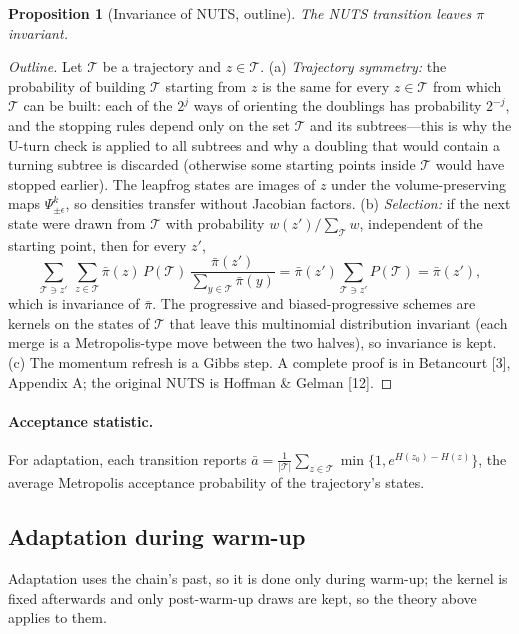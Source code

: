 \documentclass[11pt]{article}
\newtheorem{proposition}[theorem]{Proposition}
\theoremstyle{definition}
\theoremstyle{remark}
\begin{document}
\begin{proposition}[Invariance of NUTS, outline]\label{prop:nuts}
The NUTS transition leaves $\pi$ invariant.
\end{proposition}
\begin{proof}[Outline]
Let $\mathcal T$ be a trajectory and $z\in\mathcal T$. (a) \emph{Trajectory symmetry:} the probability of building $\mathcal T$ starting from $z$ is the same for every $z\in\mathcal T$ from which $\mathcal T$ can be built: each of the $2^{j}$ ways of orienting the doublings has probability $2^{-j}$, and the stopping rules depend only on the set $\mathcal T$ and its subtrees---this is why the U-turn check is applied to all subtrees and why a doubling that would contain a turning subtree is discarded (otherwise some starting points inside $\mathcal T$ would have stopped earlier). The leapfrog states are images of $z$ under the volume-preserving maps $\Psi^k_{\pm\epsilon}$, so densities transfer without Jacobian factors. (b) \emph{Selection:} if the next state were drawn from $\mathcal T$ with probability $w(z')/\sum_{\mathcal T}w$, independent of the starting point, then for every $z'$,
\[
\sum_{\mathcal T\ni z'}\ \sum_{z\in\mathcal T}\bar\pi(z)\,P(\mathcal T)\,\frac{\bar\pi(z')}{\sum_{y\in\mathcal T}\bar\pi(y)}=\bar\pi(z')\sum_{\mathcal T\ni z'}P(\mathcal T)=\bar\pi(z'),
\]
which is invariance of $\bar\pi$. The progressive and biased-progressive schemes are kernels on the states of $\mathcal T$ that leave this multinomial distribution invariant (each merge is a Metropolis-type move between the two halves), so invariance is kept. (c) The momentum refresh is a Gibbs step. A complete proof is in Betancourt [3], Appendix A; the original NUTS is Hoffman \& Gelman [12].
\end{proof}

\paragraph{Acceptance statistic.} For adaptation, each transition reports $\bar a=\frac1{|\mathcal T|}\sum_{z\in\mathcal T}\min\{1,e^{H(z_0)-H(z)}\}$, the average Metropolis acceptance probability of the trajectory's states.

\subsection{Adaptation during warm-up}
Adaptation uses the chain's past, so it is done only during warm-up; the kernel is fixed afterwards and only post-warm-up draws are kept, so the theory above applies to them.
\end{document}
